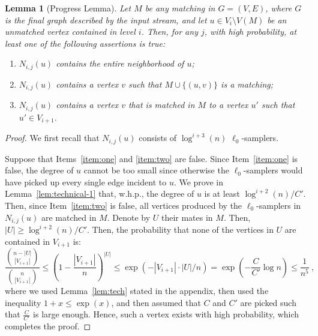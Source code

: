 \documentclass[11pt,a4paper]{article}
\newtheorem{lemma}{Lemma}
\begin{document}
\begin{lemma}[Progress Lemma]\label{lem:next-level} \label{lem:progress}
 Let $M$ be any matching in $G=(V, E)$, where $G$ is the final graph described by the input stream, and let $u \in V_i \setminus V(M)$ be an unmatched vertex contained in level $i$. Then, for any $j$, with high probability, at least one of the following assertions is true:
 \begin{enumerate}
     \item $N_{i,j}(u)$ contains the entire neighborhood of $u$; \label{item:one}
     \item $N_{i,j}(u)$ contains a vertex $v$ such that $M \cup \{(u,v) \}$ is a matching; \label{item:two}
     \item $N_{i,j}(u)$ contains a vertex $v$ that is matched in $M$ to a vertex $u'$ such that $u' \in V_{i+1}$. \label{item:three}
 \end{enumerate}
\end{lemma}
\begin{proof}We first recall that $N_{i,j}(u)$ consists of $\log^{i+3}(n)$ $\ell_0$-samplers. 

    Suppose that Items~\ref{item:one} and \ref{item:two} are false. Since Item~\ref{item:one} is false, the degree of $u$ cannot be too small since otherwise the $\ell_0$-samplers would have picked up every single edge incident to $u$. We prove in  Lemma~\ref{lem:technical-1} that, w.h.p., the degree of $u$ is at least $\log^{i+2}(n)/C'$. Then, since Item~\ref{item:two} is false, all vertices produced by the $\ell_0$-samplers in $N_{i,j}(u)$ are matched in $M$. Denote by $U$ their mates in $M$. Then, $|U| \ge \log^{i+2}(n)/C'$. Then, the probability that none of the vertices in $U$ are contained in $V_{i+1}$ is:
    $$\frac{{n - |U| \choose |V_{i+1}|}}{    
    {{n \choose |V_{i+1}|}}}  \le \left(1 - \frac{|V_{i+1}|}{n} \right)^{|U|} \le \exp(-|V_{i+1}| \cdot |U| / n) = \exp(-\frac{C}{C'} \log n) \le \frac{1}{n^5} \ ,$$
where we used Lemma~\ref{lem:tech} stated in the appendix, then used the inequality $1+x \le \exp(x)$, and then assumed that $C$ and $C'$ are picked such that $\frac{C}{C'}$ is large enough. Hence, such a vertex exists with high probability, which completes the proof.

\end{proof}
\end{document}
